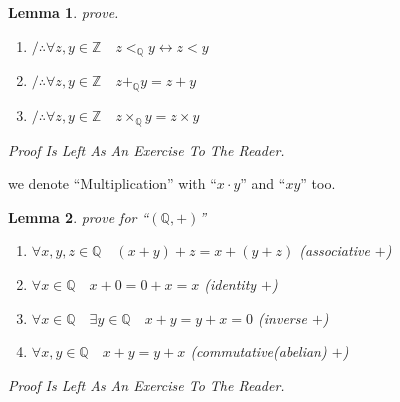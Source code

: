 \documentclass[10pt,a4paper]{book}
\newtheorem{lemma}{Lemma}[section]
\begin{document}
\begin{lemma}prove.
    \begin{enumerate}
        \setlength{\itemsep}{0pt} %
        \item       $/ \therefore   \forall z,y \in \mathbb{Z} \quad z <_\mathbb{Q} y  \leftrightarrow z  < y$
        \item       $/ \therefore   \forall z,y \in \mathbb{Z} \quad z +_\mathbb{Q} y  = z  + y$
        \item       $/ \therefore   \forall z,y \in \mathbb{Z} \quad z \times_\mathbb{Q} y  = z  \times y$
    \end{enumerate}
    Proof Is Left As An Exercise To The Reader.
\end{lemma}

we denote ``Multiplication'' with ``$x \cdot y$'' and ``$x y$'' too.

\begin{lemma}prove for  ``$ (\mathbb{Q} , +)  $''
    \begin{enumerate}
        \setlength{\itemsep}{0pt} %
        \item       $\forall x ,y ,z  \in \mathbb{Q} \quad (x +y )+z  = x +(y +z )  $ (associative $+$)
        \item       $\forall x \in \mathbb{Q} \quad x + 0 = 0 + x = x$  (identity  $+$)
        \item       $\forall x \in \mathbb{Q} \quad \exists y \in \mathbb{Q} \quad x + y = y + x = 0$  (inverse  $+$)
        \item       $\forall x ,y  \in \mathbb{Q} \quad x +y  = y +x $  (commutative(abelian)  $+$)
    \end{enumerate}
    Proof Is Left As An Exercise To The Reader.
\end{lemma}
\end{document}
